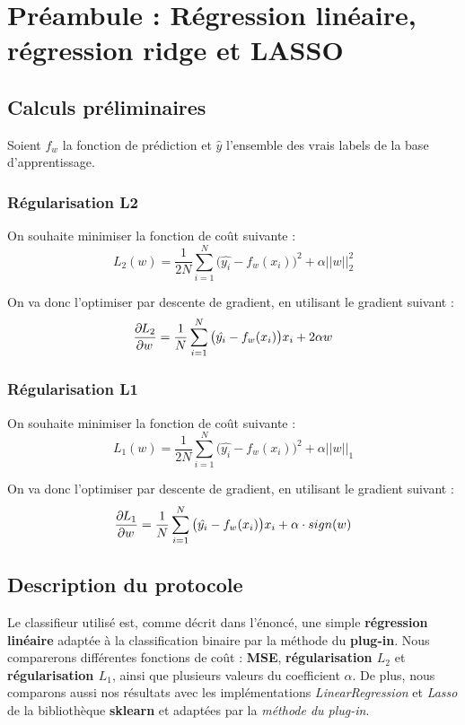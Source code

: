 \documentclass[a4paper]{memoir}
\begin{document}
\beginLectureNotes

\newpage
\section{Préambule : Régression linéaire, régression ridge et LASSO}
\subsection{Calculs préliminaires}
Soient $f_w$ la fonction de prédiction et $\hat{y}$ l'ensemble des vrais labels de la base d'apprentissage.


\subsubsection{Régularisation L2}
On souhaite minimiser la fonction de coût suivante :
\begin{equation*}
L_2(w) = \frac{1}{2N} \sum_{i=1}^{N}{\big(\hat{y_i} - f_w(x_i)\big)^2} + \alpha||w||_2^2
\end{equation*}

On va donc l'optimiser par descente de gradient, en utilisant le gradient suivant :
\begin{equation*}
\frac{\partial^{^{}}\! L_2}{\partial w^{^{}}} = \frac{1}{N} \sum_{i=1}^{N}{\big(\hat{y_i} - f_w(x_i)\big)x_i} + 2\alpha w
\end{equation*}


\subsubsection{Régularisation L1}
On souhaite minimiser la fonction de coût suivante :
\begin{equation*}
L_1(w) = \frac{1}{2N} \sum_{i=1}^{N}{\big(\hat{y_i} - f_w(x_i)\big)^2} + \alpha||w||_1
\end{equation*}

On va donc l'optimiser par descente de gradient, en utilisant le gradient suivant :
\begin{equation*}
\frac{\partial^{^{}}\! L_1}{\partial w^{^{}}} = \frac{1}{N} \sum_{i=1}^{N}{\big(\hat{y_i} - f_w(x_i)\big)x_i} + \alpha \cdot sign(w)
\end{equation*}


\subsection{Description du protocole}
Le classifieur utilisé est, comme décrit dans l'énoncé, une simple \textbf{régression linéaire} adaptée à la classification binaire par la méthode du \textbf{plug-in}. Nous comparerons différentes fonctions de coût : \textbf{MSE}, \textbf{régularisation $L_2$} et \textbf{régularisation $L_1$}, ainsi que plusieurs valeurs du coefficient $\alpha$. De plus, nous comparons aussi nos résultats avec les implémentations \textit{LinearRegression} et \textit{Lasso} de la bibliothèque \textbf{sklearn} et adaptées par la \textit{méthode du plug-in}.\\
\end{document}
